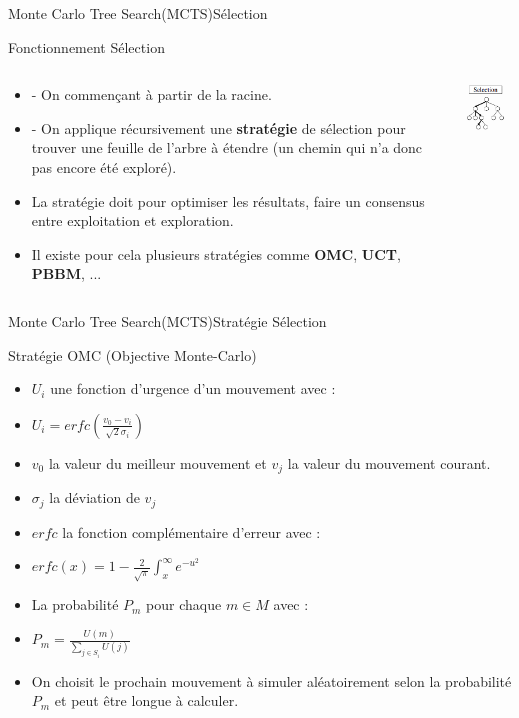 \begin{frame}{Monte Carlo Tree Search(MCTS)}{Sélection}
\begin{block}{Fonctionnement Sélection}
	\begin{columns}
		\begin{column}{7cm}
			\begin{itemize}
				\item - On commençant à partir de la racine. \item - On applique récursivement une \textbf{stratégie} de sélection pour trouver une feuille de l'arbre à étendre (un chemin qui n'a donc pas encore été exploré).
				\item La stratégie doit pour optimiser les résultats, faire un consensus entre exploitation et exploration.
				\item Il existe pour cela plusieurs stratégies comme \textbf{OMC}, \textbf{UCT}, \textbf{PBBM}, ...
			\end{itemize}
		\end{column}
		\begin{column}{4cm}
			\includegraphics[width=3cm]{ressources/Selection.png}
		\end{column}
	\end{columns}
\end{block}
\end{frame}

\begin{frame}{Monte Carlo Tree Search(MCTS)}{Stratégie Sélection}
	\begin{block}{Stratégie OMC (Objective Monte-Carlo)}
		\begin{itemize}
			\item $U_{i}$ une fonction d'urgence d'un mouvement avec :
			\item $U_{i} = erfc(\frac{v_{0} - v_{i}}{\sqrt{2}\sigma_{i}})$
			\item $v_{0}$ la valeur du meilleur mouvement et $v_{j}$ la valeur du mouvement courant.
			\item $\sigma_{j}$ la déviation de $v_{j}$
			\item $erfc$ la fonction complémentaire d'erreur avec :
			\item $erfc(x) = 1 - \frac{2}{\sqrt{\pi}}\int_{x}^{\infty}e^{-u^{2}}$
			\item La probabilité $P_{m}$ pour chaque $m \in M$ avec :
			\item $P_{m} = \frac{U(m)}{\sum_{j \in S_{i}}^{}U(j)}$
			\item On choisit le prochain mouvement à simuler aléatoirement selon la probabilité $P_{m}$ et peut être longue à calculer.
		\end{itemize}
	\end{block}
\end{frame}

